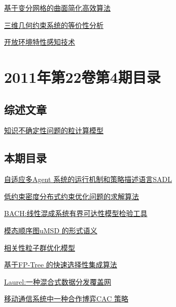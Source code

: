 \documentclass[a4paper]{article}
\begin{document}
\href{http://www.jos.org.cn/ch/reader/download_pdf.aspx?file_no=3750&year_id=2011&quarter_id=5&falg=1}{基于变分网格的曲面简化高效算法}

\href{http://www.jos.org.cn/ch/reader/download_pdf.aspx?file_no=3775&year_id=2011&quarter_id=5&falg=1}{三维几何约束系统的等价性分析}

\href{http://www.jos.org.cn/ch/reader/download_pdf.aspx?file_no=3800&year_id=2011&quarter_id=5&falg=1}{开放环境特性感知技术}


\section{\textbf{2011年第22卷第4期目录}}
\subsection{综述文章}
\href{http://www.jos.org.cn/ch/reader/download_pdf.aspx?file_no=3954&year_id=2011&quarter_id=4&falg=1}{知识不确定性问题的粒计算模型}

\subsection{本期目录}
\href{http://www.jos.org.cn/ch/reader/download_pdf.aspx?file_no=3762&year_id=2011&quarter_id=4&falg=1}{自适应多Agent 系统的运行机制和策略描述语言SADL}

\href{http://www.jos.org.cn/ch/reader/download_pdf.aspx?file_no=3765&year_id=2011&quarter_id=4&falg=1}{低约束密度分布式约束优化问题的求解算法}

\href{http://www.jos.org.cn/ch/reader/download_pdf.aspx?file_no=3766&year_id=2011&quarter_id=4&falg=1}{BACH:线性混成系统有界可达性模型检验工具}

\href{http://www.jos.org.cn/ch/reader/download_pdf.aspx?file_no=3776&year_id=2011&quarter_id=4&falg=1}{模态顺序图uMSD 的形式语义}

\href{http://www.jos.org.cn/ch/reader/download_pdf.aspx?file_no=3728&year_id=2011&quarter_id=4&falg=1}{相关性粒子群优化模型}

\href{http://www.jos.org.cn/ch/reader/download_pdf.aspx?file_no=3752&year_id=2011&quarter_id=4&falg=1}{基于FP-Tree 的快速选择性集成算法}

\href{http://www.jos.org.cn/ch/reader/download_pdf.aspx?file_no=3770&year_id=2011&quarter_id=4&falg=1}{Laurel:一种混合式数据分发覆盖网}

\href{http://www.jos.org.cn/ch/reader/download_pdf.aspx?file_no=3779&year_id=2011&quarter_id=4&falg=1}{移动通信系统中一种合作博弈CAC 策略}
\end{document}
